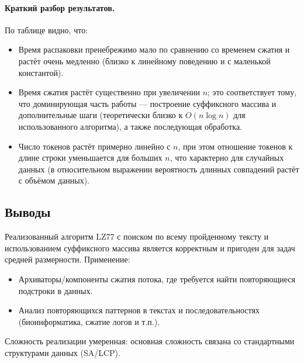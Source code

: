 \documentclass[12pt]{article}
\begin{document}
\paragraph{Краткий разбор результатов.} По таблице видно, что:
\begin{itemize}
\item Время распаковки пренебрежимо мало по сравнению со временем сжатия и растёт очень медленно (близко к линейному поведению и с маленькой константой).
\item Время сжатия растёт существенно при увеличении $n$; это соответствует тому, что доминирующая часть работы — построение суффиксного массива и дополнительные шаги (теоретически близко к $O(n\log n)$ для использованного алгоритма), а также последующая обработка.
\item Число токенов растёт примерно линейно с $n$, при этом отношение токенов к длине строки уменьшается для больших $n$, что характерно для случайных данных (в относительном выражении вероятность длинных совпадений растёт с объёмом данных).
\end{itemize}

\subsection*{Выводы}

Реализованный алгоритм LZ77 с поиском по всему пройденному тексту и использованием суффиксного массива является корректным и пригоден для задач средней размерности. Применение:
\begin{itemize}
  \item Архиваторы/компоненты сжатия потока, где требуется найти повторяющиеся подстроки в данных.
  \item Анализ повторяющихся паттернов в текстах и последовательностях (биоинформатика, сжатие логов и т.п.).
\end{itemize}

Сложность реализации умеренная: основная сложность связана со стандартными структурами данных (SA/LCP).
\end{document}
